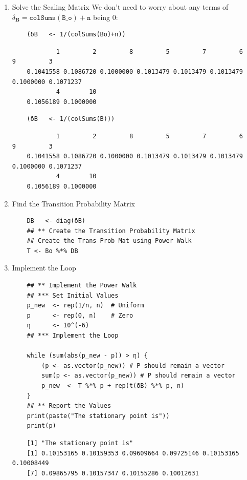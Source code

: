 \documentclass[11pt]{report}
\begin{document}
\begin{enumerate}
\item Solve the Scaling Matrix
\label{sec:org91a6dae}
We don't need to worry about any terms of \(\delta_{\mathbf{B}} = \mathtt{colSums\left(B\_o\right)+n}\) being 0:

\begin{tcolorbox}
    \begin{verbatim}
    (δB   <- 1/(colSums(Bo)+n))
    \end{verbatim}
\tcblower
    \begin{verbatim}
            1         2         8         5         7         6         9         3
    0.1041558 0.1086720 0.1000000 0.1013479 0.1013479 0.1013479 0.1000000 0.1071237
            4        10
    0.1056189 0.1000000
    \end{verbatim}
\end{tcolorbox}

\begin{tcolorbox}
    \begin{verbatim}
    (δB   <- 1/(colSums(B)))
    \end{verbatim}
\tcblower
    \begin{verbatim}
            1         2         8         5         7         6         9         3
    0.1041558 0.1086720 0.1000000 0.1013479 0.1013479 0.1013479 0.1000000 0.1071237
            4        10
    0.1056189 0.1000000
    \end{verbatim}
\end{tcolorbox}

\item Find the Transition Probability Matrix
\label{sec:org066ab51}

\begin{tcolorbox}
    \begin{verbatim}
    DB   <- diag(δB)
    ## ** Create the Transition Probability Matrix
    ## Create the Trans Prob Mat using Power Walk
    T <- Bo %*% DB
    \end{verbatim}
\end{tcolorbox}

\item Implement the Loop
\label{sec:orgbb34a45}

\begin{tcolorbox}
    \begin{verbatim}
    ## ** Implement the Power Walk
    ## *** Set Initial Values
    p_new  <- rep(1/n, n)  # Uniform
    p      <- rep(0, n)    # Zero
    η      <- 10^(-6)
    ## *** Implement the Loop

    while (sum(abs(p_new - p)) > η) {
        (p <- as.vector(p_new)) # P should remain a vector
        sum(p <- as.vector(p_new)) # P should remain a vector
        p_new  <- T %*% p + rep(t(δB) %*% p, n)
    }
    ## ** Report the Values
    print(paste("The stationary point is"))
    print(p)
    \end{verbatim}
\tcblower
    \begin{verbatim}
    [1] "The stationary point is"
    [1] 0.10153165 0.10159353 0.09609664 0.09725146 0.10153165 0.10008449
    [7] 0.09865795 0.10157347 0.10155286 0.10012631
    \end{verbatim}
\end{tcolorbox}


\end{enumerate}
\end{document}
